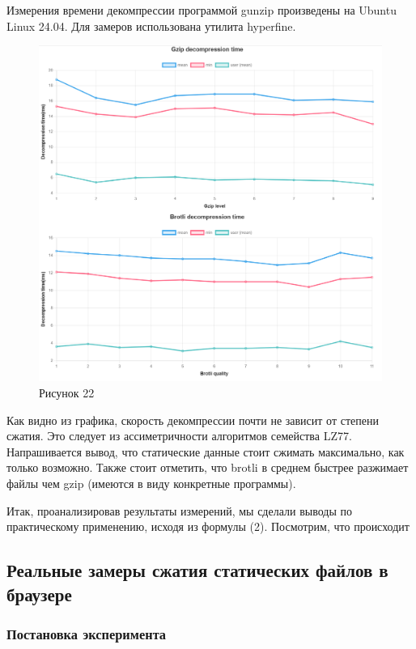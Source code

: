 \documentclass[12pt]{article}
\begin{document}
Измерения времени декомпрессии программой gunzip произведены на Ubuntu Linux 24.04. Для замеров использована утилита hyperfine.

\begin{figure}[H]
    \centering
    \includegraphics[width=1\textwidth]{../images/Decompression_time.png}
    \caption{Рисунок 22}
\end{figure}

Как видно из графика, скорость декомпрессии почти не зависит от степени сжатия. Это следует из ассиметричности алгоритмов семейства LZ77.
Напрашивается вывод, что статические данные стоит сжимать максимально, как только возможно.
Также стоит отметить, что brotli в среднем быстрее разжимает файлы чем gzip (имеются в виду конкретные программы).

Итак, проанализировав результаты измерений, мы сделали выводы по практическому применению, исходя из формулы (2).
Посмотрим, что происходит

\subsection{Реальные замеры сжатия статических файлов в браузере}

\subsubsection{Постановка эксперимента}
\end{document}
